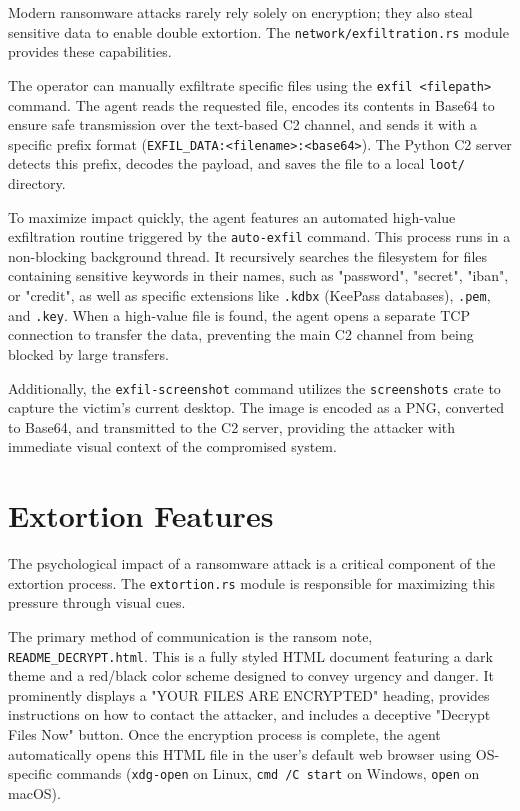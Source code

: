 \documentclass[12pt,a4paper]{article}
\newcommand{\code}[1]{\texttt{\textcolor{primaryblue}{#1}}}
\begin{document}
Modern ransomware attacks rarely rely solely on encryption; they also steal sensitive data to enable double extortion. The \code{network/exfiltration.rs} module provides these capabilities.

The operator can manually exfiltrate specific files using the \code{exfil <filepath>} command. The agent reads the requested file, encodes its contents in Base64 to ensure safe transmission over the text-based C2 channel, and sends it with a specific prefix format (\code{EXFIL\_DATA:<filename>:<base64>}). The Python C2 server detects this prefix, decodes the payload, and saves the file to a local \code{loot/} directory.

To maximize impact quickly, the agent features an automated high-value exfiltration routine triggered by the \code{auto-exfil} command. This process runs in a non-blocking background thread. It recursively searches the filesystem for files containing sensitive keywords in their names, such as "password", "secret", "iban", or "credit", as well as specific extensions like \code{.kdbx} (KeePass databases), \code{.pem}, and \code{.key}. When a high-value file is found, the agent opens a separate TCP connection to transfer the data, preventing the main C2 channel from being blocked by large transfers.

Additionally, the \code{exfil-screenshot} command utilizes the \code{screenshots} crate to capture the victim's current desktop. The image is encoded as a PNG, converted to Base64, and transmitted to the C2 server, providing the attacker with immediate visual context of the compromised system.

\section{Extortion Features}

The psychological impact of a ransomware attack is a critical component of the extortion process. The \code{extortion.rs} module is responsible for maximizing this pressure through visual cues.

The primary method of communication is the ransom note, \code{README\_DECRYPT.html}. This is a fully styled HTML document featuring a dark theme and a red/black color scheme designed to convey urgency and danger. It prominently displays a "YOUR FILES ARE ENCRYPTED" heading, provides instructions on how to contact the attacker, and includes a deceptive "Decrypt Files Now" button. Once the encryption process is complete, the agent automatically opens this HTML file in the user's default web browser using OS-specific commands (\code{xdg-open} on Linux, \code{cmd /C start} on Windows, \code{open} on macOS).
\end{document}
